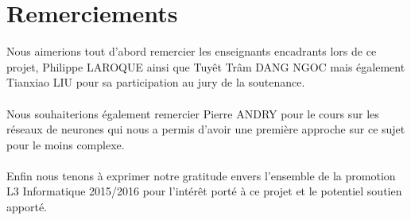 \section{Remerciements}
Nous aimerions tout d'abord remercier les enseignants encadrants lors de ce projet, Philippe LAROQUE ainsi que Tuyêt Trâm DANG NGOC mais également Tianxiao LIU pour sa participation au jury de la soutenance.\\\\
Nous souhaiterions également remercier Pierre ANDRY pour le cours sur les réseaux de neurones qui nous a permis d'avoir une première approche sur ce sujet pour le moins complexe.\\\\
Enfin nous tenons à exprimer notre gratitude envers l'ensemble de la promotion L3 Informatique 2015/2016 pour l'intérêt porté à ce projet et le potentiel soutien apporté.